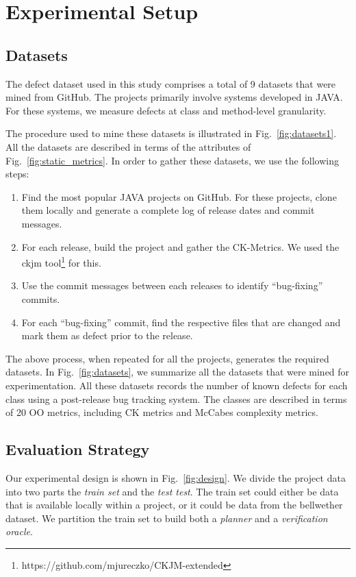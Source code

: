 \documentclass[sigconf, proceedings, 9pt]{acmart}
\newcommand{\be}{\begin{enumerate}}
\newcommand{\ee}{\end{enumerate}}
\newcommand{\fig}[1]{Fig.~\ref{fig:#1}}
\begin{document}
\section{Experimental Setup}
\label{sect:expt}

\subsection{Datasets}
\label{sect:datasets}




The defect dataset used in this study comprises a total of 9 datasets that were 
mined from GitHub. The projects primarily involve systems developed in JAVA. 
For these systems, we measure defects at class and method-level granularity. 

The procedure used to mine these datasets is illustrated in 
\fig{datasets1}. All the datasets are 
described in terms of the attributes of \fig{static_metrics}. In order to 
gather these datasets, we use the following steps:
\be
\item Find the most popular JAVA projects on GitHub. For these projects, clone 
them locally and generate a complete log of release dates and commit messages.
\item For each release, build the project and gather the CK-Metrics. We used 
the ckjm tool\footnote{https://github.com/mjureczko/CKJM-extended} for this.
\item Use the commit messages between each releases to identify ``bug-fixing'' 
commits.
\item For each ``bug-fixing'' commit, find the respective files that are 
changed and mark them as defect prior to the release.
\ee

The above process, when repeated for all the projects, generates the required 
datasets. In \fig{datasets}, we summarize all the datasets that were mined for 
experimentation. All these datasets records the number of known defects 
for each class using a post-release bug tracking system. The classes are 
described in terms of 20 OO metrics, including CK metrics and McCabes 
complexity metrics. 


\subsection{Evaluation Strategy}
\label{sect:procedure}


Our experimental design is shown in \fig{design}. We divide the
project data  into two parts the \textit{train set} and the \textit{test test}.
The train set could either be data that is available locally within a project, 
or it could be data from the bellwether dataset. We partition the train set to 
build both a {\em planner} and a {\em  verification oracle}. 
\end{document}

